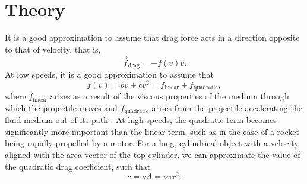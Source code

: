 \documentclass[aps,pra,twocolumn]{revtex4-1}
\begin{document}
\section{\label{section 2} Theory}
It is a good approximation to assume that drag force acts in a direction opposite to that of velocity, that is,
\begin{equation}
\vec{f}_\text{drag} = - f(v) \hat{v}.
\end{equation}
At low speeds, it is a good approximation to assume that
\begin{equation}
f(v) = b v + c v^2 = f_\text{linear} + f_\text{quadratic},
\end{equation}
where $f_\text{linear}$ arises as a result of the viscous properties of the medium through which the projectile moves and $f_\text{quadratic}$ arises from the projectile accelerating the fluid medium out of its path \cite{taylor2005}.  At high speeds, the quadratic term becomes significantly more important than the linear term, such as in the case of a rocket being rapidly propelled by a motor.  For a long, cylindrical object with a velocity aligned with the area vector of the top cylinder, we can approximate the value of the quadratic drag coefficient, such that
\begin{equation}
c = \nu A = \nu \pi r^2.
\end{equation}
\end{document}
